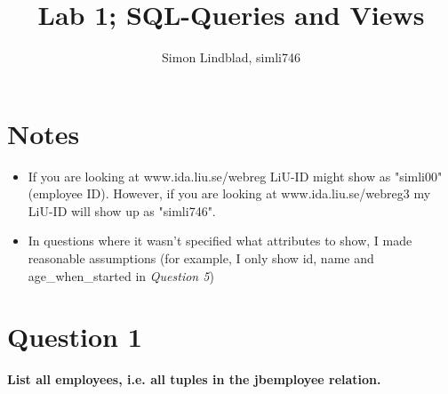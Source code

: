 \documentclass{article}
\title{Lab 1; SQL-Queries and Views}
\author{Simon Lindblad, simli746}
\begin{document}
\maketitle

\section*{Notes}
\begin{itemize}
	\item If you are looking at www.ida.liu.se/webreg LiU-ID might show as "simli00" (employee ID). However, if you are looking at www.ida.liu.se/webreg3 my LiU-ID will show up as "simli746".
	\item In questions where it wasn't specified what attributes to show, I made reasonable assumptions (for example, I only show id, name and age\_when\_started in \textit{Question 5})
\end{itemize}

\section*{Question 1}
\textbf{List all employees, i.e. all tuples in the jbemployee relation.}
\end{document}
